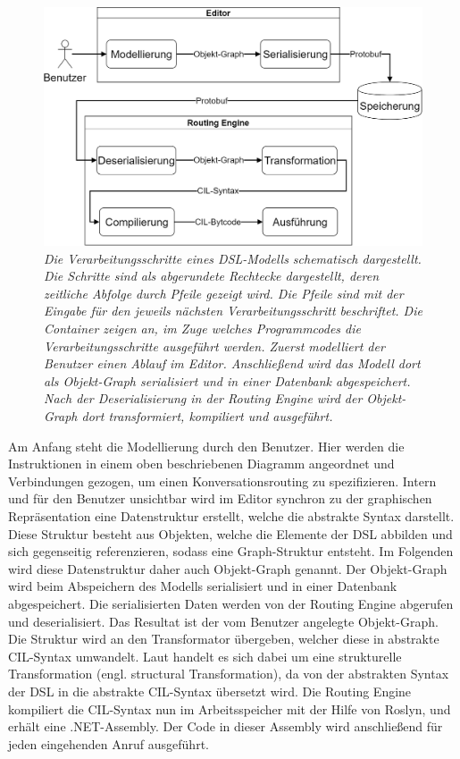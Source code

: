\begin{figure} %
	\centering
		\includegraphics[width=\textwidth]{img/Verarbeitungsschritte.png}
	\caption[Verarbeitungsschritte eines DSL-Modells]{\textit{Die Verarbeitungsschritte eines DSL-Modells schematisch dargestellt. Die Schritte sind als abgerundete Rechtecke dargestellt, deren zeitliche Abfolge durch Pfeile gezeigt wird. Die Pfeile sind mit der Eingabe für den jeweils nächsten Verarbeitungsschritt beschriftet. Die Container zeigen an, im Zuge welches Programmcodes die Verarbeitungsschritte ausgeführt werden. Zuerst modelliert der Benutzer einen Ablauf im Editor. Anschließend wird das Modell dort als Objekt-Graph serialisiert und in einer Datenbank abgespeichert. Nach der Deserialisierung in der Routing Engine wird der Objekt-Graph dort transformiert, kompiliert und ausgeführt.}}
	\label{fig:Verarbeitungsschritte}
\end{figure}
\noindent Am Anfang steht die Modellierung durch den Benutzer. Hier werden die Instruktionen in einem oben beschriebenen Diagramm angeordnet und Verbindungen gezogen, um einen Konversationsrouting zu spezifizieren. Intern und für den Benutzer unsichtbar wird im Editor synchron zu der graphischen Repräsentation eine Datenstruktur erstellt, welche die abstrakte Syntax darstellt. Diese Struktur besteht aus Objekten, welche die Elemente der DSL abbilden und sich gegenseitig referenzieren, sodass eine Graph-Struktur entsteht. Im Folgenden wird diese Datenstruktur daher auch Objekt-Graph genannt. Der Objekt-Graph wird beim Abspeichern des Modells serialisiert und in einer Datenbank abgespeichert. Die serialisierten Daten werden von der Routing Engine abgerufen und deserialisiert. Das Resultat ist der vom Benutzer angelegte Objekt-Graph. Die Struktur wird an den Transformator übergeben, welcher diese in abstrakte CIL-Syntax umwandelt. Laut \cite[S. 72f]{Kleppe:09} handelt es sich dabei um eine strukturelle Transformation (engl. structural Transformation), da von der abstrakten Syntax der DSL in die abstrakte CIL-Syntax übersetzt wird. Die Routing Engine kompiliert die CIL-Syntax nun im Arbeitsspeicher mit der Hilfe von Roslyn, und erhält eine .NET-Assembly. Der Code in dieser Assembly wird anschließend für jeden eingehenden Anruf ausgeführt. 

